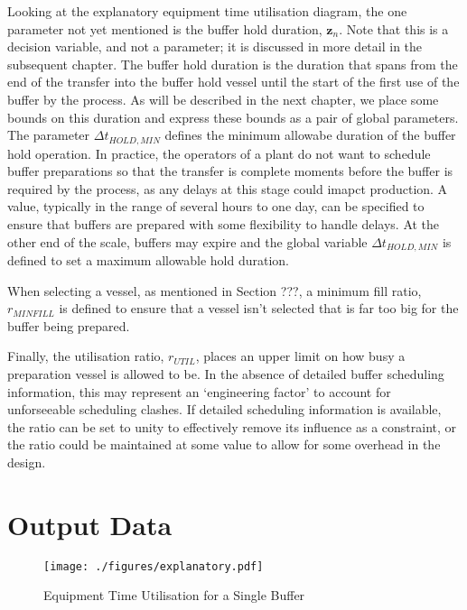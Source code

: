 Looking at the explanatory equipment time utilisation diagram, the one
parameter not yet mentioned is the buffer hold duration, $\boldsymbol{z}_{n}$.
Note that this is a decision variable, and not a parameter; it is discussed in
more detail in the subsequent chapter.
The buffer hold duration is the duration that spans from the end of the
transfer into the buffer hold vessel until the start of the first use of the
buffer by the process.
As will be described in the next chapter, we place some bounds on this duration
and express these bounds as a pair of global parameters.
The parameter $\Delta t_{\mathit{HOLD,MIN}}$ defines the minimum allowabe
duration of the buffer hold operation.
In practice, the operators of a plant do not want to schedule buffer
preparations so that the transfer is complete moments before the buffer is
required by the process, as any delays at this stage could imapct production.
A value, typically in the range of several hours to one day, can be specified
to ensure that buffers are prepared with some flexibility to handle delays.
At the other end of the scale, buffers may expire and the global variable 
$\Delta t_{\mathit{HOLD,MIN}}$ is defined to set a maximum allowable hold
duration.

When selecting a vessel, as mentioned in Section ???, a minimum fill ratio,
$r_{\mathit{MINFILL}}$ is defined to ensure that a vessel isn't selected that
is far too big for the buffer being prepared.

Finally, the utilisation ratio, $r_{\mathit{UTIL}}$, places an upper limit on
how busy a preparation vessel is allowed to be.
In the absence of detailed buffer scheduling information, this may represent an
`engineering factor' to account for unforseeable scheduling clashes.
If detailed scheduling information is available, the ratio can be set to unity
to effectively remove its influence as a constraint, or the ratio could be
maintained at some value to allow for some overhead in the design.

\section{Output Data}\label{S.outputdata}

\begin{figure}
    \centering
    \texttt{[image: ./figures/explanatory.pdf]}
    \caption{Equipment Time Utilisation for a Single Buffer}
    \label{fig.explanatory}
\end{figure}
